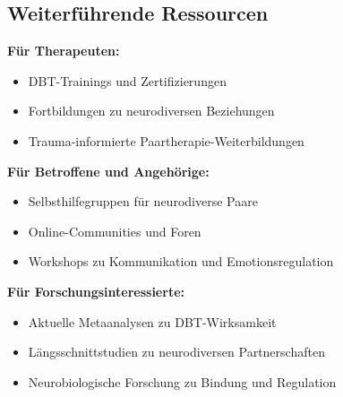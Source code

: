 \subsection{Weiterführende Ressourcen}

\begin{ctmmGreenBox}[title=Empfohlene Vertiefung]

\textbf{Für Therapeuten:}
\begin{itemize}
    \item DBT-Trainings und Zertifizierungen
    \item Fortbildungen zu neurodiversen Beziehungen
    \item Trauma-informierte Paartherapie-Weiterbildungen
\end{itemize}

\textbf{Für Betroffene und Angehörige:}
\begin{itemize}
    \item Selbsthilfegruppen für neurodiverse Paare
    \item Online-Communities und Foren
    \item Workshops zu Kommunikation und Emotionsregulation
\end{itemize}

\textbf{Für Forschungsinteressierte:}
\begin{itemize}
    \item Aktuelle Metaanalysen zu DBT-Wirksamkeit
    \item Längsschnittstudien zu neurodiversen Partnerschaften
    \item Neurobiologische Forschung zu Bindung und Regulation
\end{itemize}

\end{ctmmGreenBox}

\newpage
